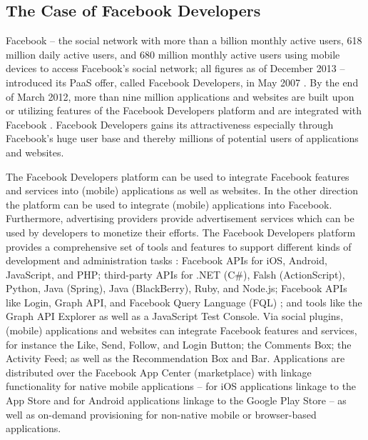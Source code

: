 \subsection{The Case of Facebook Developers}\label{ch:sota:fd}

Facebook -- the social network with more than a billion monthly active users, 618 million daily active users, and 680 million monthly active users using mobile devices to access Facebook's social network; all figures as of December 2013 -- introduced its \ac{PaaS} offer, called Facebook Developers, in May 2007 \citep{Facebook2013}. By the end of March 2012, more than nine million applications and websites are built upon or utilizing features of the Facebook Developers platform and are integrated with Facebook \citep{Facebook2013}. Facebook Developers gains its attractiveness especially through Facebook's huge user base and thereby millions of potential users of applications and websites.

The Facebook Developers platform can be used to integrate Facebook features and services into (mobile) applications as well as websites. In the other direction the platform can be used to integrate (mobile) applications into Facebook. Furthermore, advertising providers provide advertisement services which can be used by developers to monetize their efforts. The Facebook Developers platform provides a comprehensive set of tools and features to support different kinds of development and administration tasks \citep{Facebook2013a}: Facebook \acp{API} for iOS, Android, JavaScript, and PHP; third-party \acp{API} for .NET (C\#), Falsh (ActionScript), Python, Java (Spring), Java (BlackBerry), Ruby, and Node.js; Facebook \acp{API} like Login, Graph \ac{API}, and Facebook Query Language (FQL) ; and tools like the Graph \ac{API} Explorer as well as a JavaScript Test Console. Via social plugins, (mobile) applications and websites can integrate Facebook features and services, for instance the Like, Send, Follow, and Login Button; the Comments Box; the Activity Feed; as well as the Recommendation Box and Bar. Applications are distributed over the Facebook App Center (marketplace) with linkage functionality for native mobile applications -- for iOS applications linkage to the App Store and for Android applications linkage to the Google Play Store -- as well as on-demand provisioning for non-native mobile or browser-based applications.

